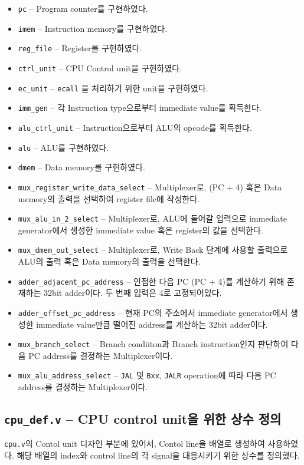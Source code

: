 \documentclass{scrartcl}
\begin{document}
\begin{itemize}
    \item \texttt{pc} -- Program counter를 구현하였다.
    \item \texttt{imem} -- Instruction memory를 구현하였다.
    \item \texttt{reg\_file} -- Register를 구현하였다.
    \item \texttt{ctrl\_unit} -- CPU Control unit을 구현하였다.
    \item \texttt{ec\_unit} -- \texttt{ecall} 을 처리하기 위한 unit을 구현하였다.
    \item \texttt{imm\_gen} -- 각 Instruction type으로부터 immediate value를 획득한다.
    \item \texttt{alu\_ctrl\_unit} -- Instruction으로부터 ALU의 opcode를 획득한다.
    \item \texttt{alu} -- ALU를 구현하였다.
    \item \texttt{dmem} -- Data memory를 구현하였다.
    \item \texttt{mux\_register\_write\_data\_select} -- Multiplexer로, (PC + 4) 혹은 Data memory의 출력을 선택하여 register file에 작성한다.
    \item \texttt{mux\_alu\_in\_2\_select} -- Multiplexer로, ALU에 들어갈 입력으로 immediate generator에서 생성한 immediate value 혹은 register의 값을 선택한다.
    \item \texttt{mux\_dmem\_out\_select} -- Multiplexer로, Write Back 단계에 사용할 출력으로 ALU의 출력 혹은 Data memory의 출력을 선택한다.
    \item \texttt{adder\_adjacent\_pc\_address} -- 인접한 다음 PC (PC + 4)를 계산하기 위해 존재하는 32bit adder이다. 두 번째 입력은 4로 고정되어있다.
    \item \texttt{adder\_offset\_pc\_address} -- 현재 PC의 주소에서 immediate generator에서 생성한 immediate value만큼 떨어진 address를 계산하는 32bit adder이다.
    \item \texttt{mux\_branch\_select} -- Branch condiiton과 Branch instruction인지 판단하여 다음 PC address를 결정하는 Multiplexer이다.
    \item \texttt{mux\_alu\_address\_select} -- \texttt{JAL} 및 \texttt{Bxx}, \texttt{JALR} operation에 따라 다음 PC address를 결정하는 Multiplexer이다.
\end{itemize}


\subsection{\texttt{cpu\_def.v} -- CPU control unit을 위한 상수 정의}
\texttt{cpu.v}의 Contol unit 디자인 부분에 있어서, Contol line을 배열로 생성하여 사용하였다.
해당 배열의 index와 control line의 각 signal을 대응시키기 위한 상수를 정의했다.
\end{document}
